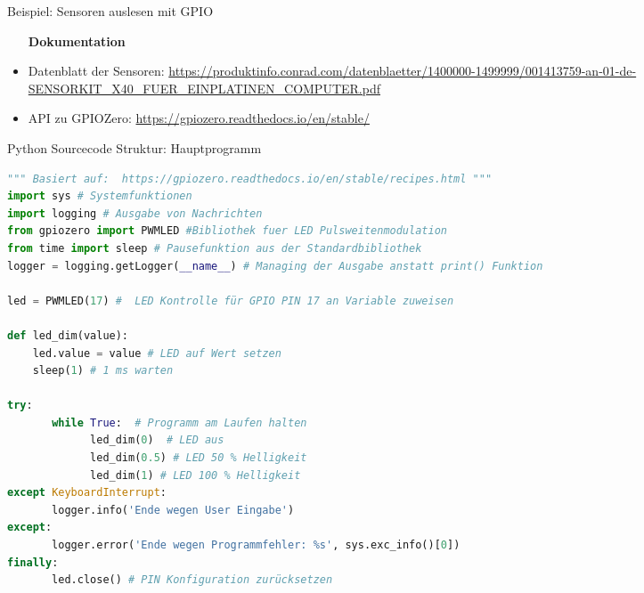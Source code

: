 \begin{frame}{Beispiel: Sensoren auslesen mit GPIO}
    \begin{itemize}
    \setlength{\itemindent}{1.0in}
     \item [\textbf{ Dokumentation}]
    \end{itemize}

    \begin{itemize}
        \item  Datenblatt der Sensoren: \url{https://produktinfo.conrad.com/datenblaetter/1400000-1499999/001413759-an-01-de-SENSORKIT_X40_FUER_EINPLATINEN_COMPUTER.pdf}
        \item  API zu GPIOZero: \url{https://gpiozero.readthedocs.io/en/stable/} 
     \end{itemize}
\end{frame}


\begin{frame}[fragile]{Python Sourcecode Struktur: Hauptprogramm}
\begin{lstlisting}[language=Python]
""" Basiert auf:  https://gpiozero.readthedocs.io/en/stable/recipes.html """
import sys # Systemfunktionen
import logging # Ausgabe von Nachrichten
from gpiozero import PWMLED #Bibliothek fuer LED Pulsweitenmodulation
from time import sleep # Pausefunktion aus der Standardbibliothek
logger = logging.getLogger(__name__) # Managing der Ausgabe anstatt print() Funktion

led = PWMLED(17) #  LED Kontrolle für GPIO PIN 17 an Variable zuweisen

def led_dim(value):
    led.value = value # LED auf Wert setzen
    sleep(1) # 1 ms warten

try:
       while True:  # Programm am Laufen halten
             led_dim(0)  # LED aus
             led_dim(0.5) # LED 50 % Helligkeit
             led_dim(1) # LED 100 % Helligkeit
except KeyboardInterrupt:  
       logger.info('Ende wegen User Eingabe')
except:  
       logger.error('Ende wegen Programmfehler: %s', sys.exc_info()[0])
finally:  
       led.close() # PIN Konfiguration zurücksetzen

\end{lstlisting}
\end{frame}


